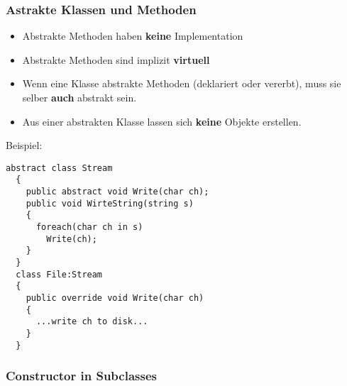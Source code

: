 \subsubsection{Astrakte Klassen und Methoden}
\begin{itemize}
  \item Abstrakte Methoden haben \textbf{keine} Implementation
  \item Abstrakte Methoden sind implizit \textbf{virtuell}
  \item Wenn eine Klasse abstrakte Methoden (deklariert oder vererbt), muss sie
  selber \textbf{auch} abstrakt sein. 
  \item Aus einer abstrakten Klasse lassen sich \textbf{keine} Objekte
  erstellen. 
\end{itemize}
Beispiel: 
\begin{lstlisting}[style=Csharp]
  abstract class Stream
  {
    public abstract void Write(char ch);
    public void WirteString(string s)
    {
      foreach(char ch in s) 
        Write(ch); 
    }
  }
  class File:Stream
  {
    public override void Write(char ch)
    {
      ...write ch to disk...
    }
  }
\end{lstlisting}


\subsubsection{Constructor in Subclasses}

